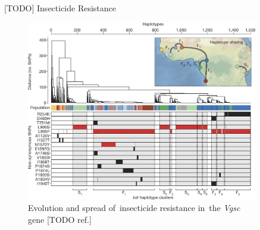 \documentclass[final,hyperref={pdfpagelabels=false}]{beamer}
\begin{document}
\begin{frame}[t]
\begin{columns}[t]
\begin{column}{.465\textwidth}
\begin{block}{[TODO] Insecticide Resistance}

\begin{figure}
\includegraphics[width=.95\linewidth]{nature-mosquitoes/fig_4}
\caption{Evolution and spread of~insecticide resistance in~the \textit{Vgsc} gene [TODO ref.]}
\end{figure}

\end{block}


\end{column} %

\begin{column}{.03\textwidth}\end{column} %
 
\begin{column}{.465\textwidth} %


\end{column}
\end{columns}
\end{frame}
\end{document}
